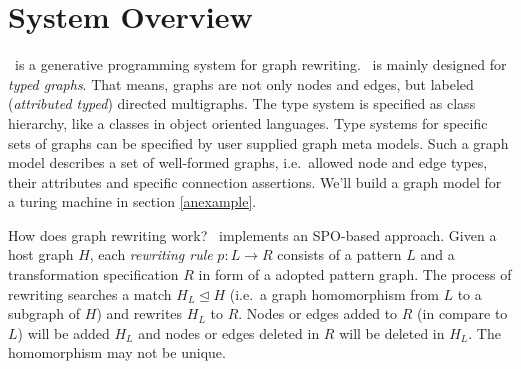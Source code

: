 \chapter{System Overview}

\GrG\ is a generative programming system for graph rewriting. \GrG\ is mainly designed for \emph{typed graphs}.  That means, graphs are not only nodes and edges, but labeled (\emph{attributed typed}) directed multigraphs. The type system is specified as class hierarchy, like a classes in object oriented languages. Type systems for specific sets of graphs can be specified by user supplied graph meta models. Such a graph model describes a set of well-formed graphs, i.e.\ allowed node and edge types, their attributes and specific connection assertions. We'll build a graph model for a turing machine in section \ref{anexample}.

How does graph rewriting work? \GrG\ implements an SPO-based approach. Given a host graph $H$, each \emph{rewriting rule} $p: L \longrightarrow R$ consists of a pattern $L$ and a transformation specification $R$ in form of a adopted pattern graph. The process of rewriting searches a match $H_L \unlhd H$ (i.e.\ a graph homomorphism from $L$ to a subgraph of $H$) and rewrites $H_L$ to $R$. Nodes or edges added to $R$ (in compare to $L$) will be added $H_L$ and nodes or edges deleted in $R$ will be deleted in $H_L$. The homomorphism may not be unique.

